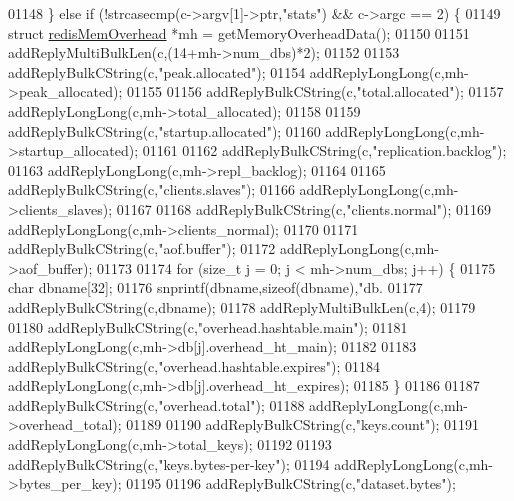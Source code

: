 \begin{DoxyCode}
{{{01148     \} \textcolor{keywordflow}{else} \textcolor{keywordflow}{if} (!strcasecmp(c->argv[1]->ptr,\textcolor{stringliteral}{"stats"}) && c->argc == 2) \{
01149         \textcolor{keyword}{struct} \hyperlink{structredisMemOverhead}{redisMemOverhead} *mh = getMemoryOverheadData();
01150 
01151         addReplyMultiBulkLen(c,(14+mh->num\_dbs)*2);
01152 
01153         addReplyBulkCString(c,\textcolor{stringliteral}{"peak.allocated"});
01154         addReplyLongLong(c,mh->peak\_allocated);
01155 
01156         addReplyBulkCString(c,\textcolor{stringliteral}{"total.allocated"});
01157         addReplyLongLong(c,mh->total\_allocated);
01158 
01159         addReplyBulkCString(c,\textcolor{stringliteral}{"startup.allocated"});
01160         addReplyLongLong(c,mh->startup\_allocated);
01161 
01162         addReplyBulkCString(c,\textcolor{stringliteral}{"replication.backlog"});
01163         addReplyLongLong(c,mh->repl\_backlog);
01164 
01165         addReplyBulkCString(c,\textcolor{stringliteral}{"clients.slaves"});
01166         addReplyLongLong(c,mh->clients\_slaves);
01167 
01168         addReplyBulkCString(c,\textcolor{stringliteral}{"clients.normal"});
01169         addReplyLongLong(c,mh->clients\_normal);
01170 
01171         addReplyBulkCString(c,\textcolor{stringliteral}{"aof.buffer"});
01172         addReplyLongLong(c,mh->aof\_buffer);
01173 
01174         \textcolor{keywordflow}{for} (size\_t j = 0; j < mh->num\_dbs; j++) \{
01175             \textcolor{keywordtype}{char} dbname[32];
01176             snprintf(dbname,\textcolor{keyword}{sizeof}(dbname),\textcolor{stringliteral}{"db.%
01177             addReplyBulkCString(c,dbname);
01178             addReplyMultiBulkLen(c,4);
01179 
01180             addReplyBulkCString(c,\textcolor{stringliteral}{"overhead.hashtable.main"});
01181             addReplyLongLong(c,mh->db[j].overhead\_ht\_main);
01182 
01183             addReplyBulkCString(c,\textcolor{stringliteral}{"overhead.hashtable.expires"});
01184             addReplyLongLong(c,mh->db[j].overhead\_ht\_expires);
01185         \}
01186 
01187         addReplyBulkCString(c,\textcolor{stringliteral}{"overhead.total"});
01188         addReplyLongLong(c,mh->overhead\_total);
01189 
01190         addReplyBulkCString(c,\textcolor{stringliteral}{"keys.count"});
01191         addReplyLongLong(c,mh->total\_keys);
01192 
01193         addReplyBulkCString(c,\textcolor{stringliteral}{"keys.bytes-per-key"});
01194         addReplyLongLong(c,mh->bytes\_per\_key);
01195 
01196         addReplyBulkCString(c,\textcolor{stringliteral}{"dataset.bytes"});
}}}}
\end{DoxyCode}

